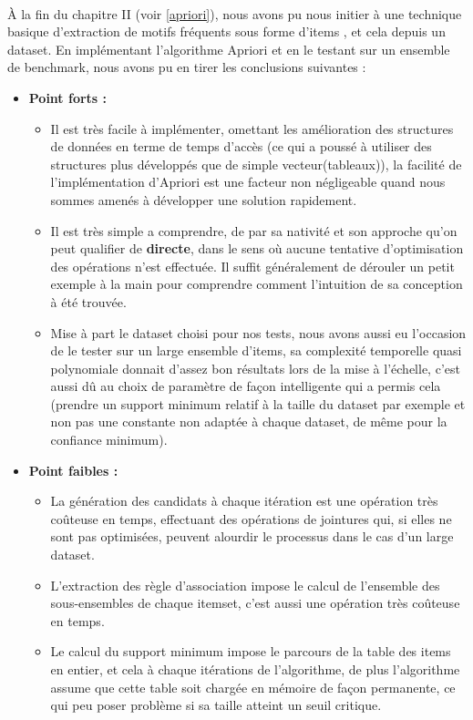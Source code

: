 \documentclass[12pt]{report}
\begin{document}
		\paragraph{}
		À la fin du chapitre II (voir \ref{apriori}), nous avons pu nous initier à une technique basique d'extraction de motifs fréquents sous forme d'items , et cela depuis un dataset. En implémentant l'algorithme Apriori et en le testant sur un ensemble de benchmark, nous avons pu en tirer les conclusions suivantes : 
		\begin{itemize}
			\item \textbf{Point forts :} 
			 \begin{itemize}
				\item Il est très facile à implémenter, omettant les amélioration des structures de données en terme de temps d'accès (ce qui a poussé à utiliser des structures plus développés que de simple vecteur(tableaux)), la facilité de l'implémentation d'Apriori est une facteur non négligeable quand nous sommes amenés à développer une solution rapidement.
				\item Il est très simple a comprendre, de par sa nativité et son approche qu'on peut qualifier de \textbf{directe}, dans le sens où aucune tentative d'optimisation des opérations n'est effectuée. Il suffit généralement de dérouler un petit exemple à la main pour comprendre comment l'intuition de sa conception à été trouvée. 
				\item Mise à part le dataset choisi pour nos tests, nous avons aussi eu l'occasion de le tester sur un large ensemble d'items, sa complexité temporelle quasi polynomiale donnait d'assez bon résultats lors de la mise à l'échelle, c'est aussi dû au choix de paramètre de façon intelligente qui a permis cela (prendre un support minimum relatif à la taille du dataset par exemple et non pas une constante non adaptée à chaque dataset, de même pour la confiance minimum). 
			\end{itemize}
			\item \textbf{Point faibles : }
				\begin{itemize}
					\item  La génération des candidats à chaque itération est une opération très coûteuse en temps, effectuant des opérations de jointures qui, si elles ne sont pas optimisées, peuvent alourdir le processus dans le cas d'un large dataset.
					\item L'extraction des règle d'association impose le calcul de l'ensemble des sous-ensembles de chaque itemset, c'est aussi une opération très coûteuse en temps.
					\item Le calcul du support minimum impose le parcours de la table des items en entier, et cela à chaque itérations de l'algorithme, de plus l'algorithme assume que cette table soit chargée en mémoire de façon permanente, ce qui peu poser problème si sa taille atteint un seuil critique.
				\end{itemize} 
		\end{itemize}
\end{document}
